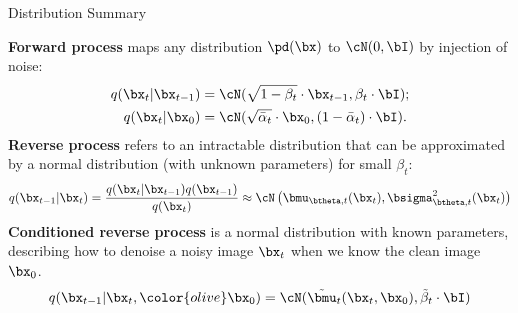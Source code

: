 \documentclass{beamer}
\begin{document}
\begin{frame}{Distribution Summary}

    \textbf{Forward process} maps any distribution $\pd(\bx)$ to $\cN(0, \bI)$ by injection of noise:
    \begin{align*}
        q(\bx_t | \bx_{t-1}) &= \cN(\sqrt{1 - \beta_t} \cdot \bx_{t-1}, \beta_t \cdot \bI); \\
        q(\bx_t | \bx_0) &= \cN(\sqrt{\bar{\alpha}_t} \cdot \bx_0, (1 - \bar{\alpha}_t) \cdot \bI).
    \end{align*}
    \eqpause
    \textbf{Reverse process} refers to an intractable distribution that can be approximated by a normal distribution (with unknown parameters) for small $\beta_t$:
    \[
        q(\bx_{t-1}|\bx_{t}) = \frac{q(\bx_{t}|\bx_{t-1}) q(\bx_{t-1})}{q(\bx_{t})} \approx \cN \left(\bmu_{\btheta, t}(\bx_t), \bsigma_{\btheta, t}^2(\bx_t)\right)
    \]
    \eqpause
    \textbf{Conditioned reverse process} is a normal distribution with known parameters, describing how to denoise a noisy image $\bx_t$ when we know the clean image $\bx_0$.
    \[
        q(\bx_{t-1}|\bx_{t}, {\color{olive}\bx_0}) = \cN(\tilde{\bmu}_t(\bx_t, \bx_0), \tilde{\beta}_t \cdot \bI)
    \]
\end{frame}
\end{document}
